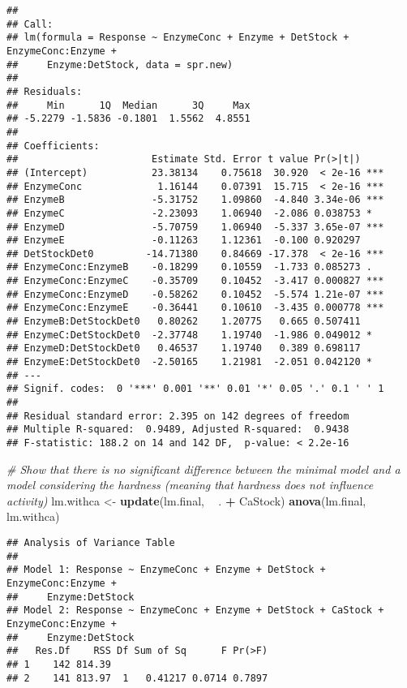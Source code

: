 \documentclass[
]{article}
\newenvironment{Shaded}{\begin{snugshade}}{\end{snugshade}}
\newcommand{\CommentTok}[1]{\textcolor[rgb]{0.56,0.35,0.01}{\textit{#1}}}
\newcommand{\KeywordTok}[1]{\textcolor[rgb]{0.13,0.29,0.53}{\textbf{#1}}}
\newcommand{\NormalTok}[1]{#1}
\newcommand{\OperatorTok}[1]{\textcolor[rgb]{0.81,0.36,0.00}{\textbf{#1}}}
\newcommand{\StringTok}[1]{\textcolor[rgb]{0.31,0.60,0.02}{#1}}
\begin{document}
\begin{verbatim}
## 
## Call:
## lm(formula = Response ~ EnzymeConc + Enzyme + DetStock + EnzymeConc:Enzyme + 
##     Enzyme:DetStock, data = spr.new)
## 
## Residuals:
##     Min      1Q  Median      3Q     Max 
## -5.2279 -1.5836 -0.1801  1.5562  4.8551 
## 
## Coefficients:
##                       Estimate Std. Error t value Pr(>|t|)    
## (Intercept)           23.38134    0.75618  30.920  < 2e-16 ***
## EnzymeConc             1.16144    0.07391  15.715  < 2e-16 ***
## EnzymeB               -5.31752    1.09860  -4.840 3.34e-06 ***
## EnzymeC               -2.23093    1.06940  -2.086 0.038753 *  
## EnzymeD               -5.70759    1.06940  -5.337 3.65e-07 ***
## EnzymeE               -0.11263    1.12361  -0.100 0.920297    
## DetStockDet0         -14.71380    0.84669 -17.378  < 2e-16 ***
## EnzymeConc:EnzymeB    -0.18299    0.10559  -1.733 0.085273 .  
## EnzymeConc:EnzymeC    -0.35709    0.10452  -3.417 0.000827 ***
## EnzymeConc:EnzymeD    -0.58262    0.10452  -5.574 1.21e-07 ***
## EnzymeConc:EnzymeE    -0.36441    0.10610  -3.435 0.000778 ***
## EnzymeB:DetStockDet0   0.80262    1.20775   0.665 0.507411    
## EnzymeC:DetStockDet0  -2.37748    1.19740  -1.986 0.049012 *  
## EnzymeD:DetStockDet0   0.46537    1.19740   0.389 0.698117    
## EnzymeE:DetStockDet0  -2.50165    1.21981  -2.051 0.042120 *  
## ---
## Signif. codes:  0 '***' 0.001 '**' 0.01 '*' 0.05 '.' 0.1 ' ' 1
## 
## Residual standard error: 2.395 on 142 degrees of freedom
## Multiple R-squared:  0.9489, Adjusted R-squared:  0.9438 
## F-statistic: 188.2 on 14 and 142 DF,  p-value: < 2.2e-16
\end{verbatim}

\begin{Shaded}
\begin{Highlighting}[]
\CommentTok{# Show that there is no significant difference between the minimal model and a model considering the hardness (meaning that hardness does not influence activity)}
\NormalTok{lm.withca <-}\StringTok{ }\KeywordTok{update}\NormalTok{(lm.final, }\OperatorTok{~}\StringTok{ }\NormalTok{. }\OperatorTok{+}\StringTok{ }\NormalTok{CaStock)}
\KeywordTok{anova}\NormalTok{(lm.final, lm.withca)}
\end{Highlighting}
\end{Shaded}

\begin{verbatim}
## Analysis of Variance Table
## 
## Model 1: Response ~ EnzymeConc + Enzyme + DetStock + EnzymeConc:Enzyme + 
##     Enzyme:DetStock
## Model 2: Response ~ EnzymeConc + Enzyme + DetStock + CaStock + EnzymeConc:Enzyme + 
##     Enzyme:DetStock
##   Res.Df    RSS Df Sum of Sq      F Pr(>F)
## 1    142 814.39                           
## 2    141 813.97  1   0.41217 0.0714 0.7897
\end{verbatim}
\end{document}
